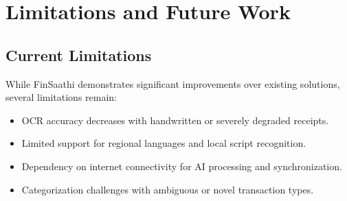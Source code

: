 \documentclass[10pt,twocolumn,twoside,a4paper]{article}
\begin{document}
\section{Limitations and Future Work}
\subsection{Current Limitations}
While FinSaathi demonstrates significant improvements over existing solutions, several limitations remain:
\begin{itemize}[leftmargin=*]
  \item OCR accuracy decreases with handwritten or severely degraded receipts.
  \item Limited support for regional languages and local script recognition.
  \item Dependency on internet connectivity for AI processing and synchronization.
  \item Categorization challenges with ambiguous or novel transaction types.
\end{itemize}
\end{document}
